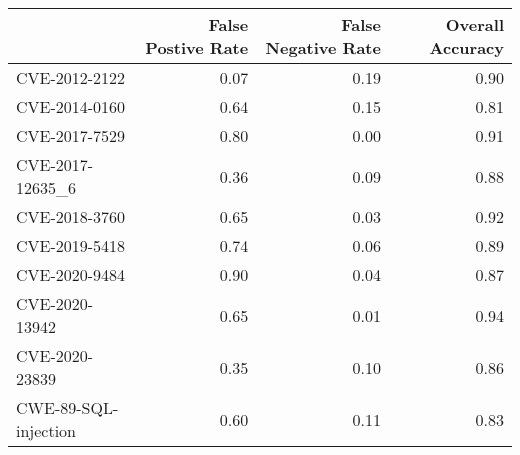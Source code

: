 \begin{tabular}{lrrr}
\toprule
{} &  False Postive Rate &  False Negative Rate &  Overall Accuracy \\
\midrule
CVE-2012-2122        &                0.07 &                 0.19 &              0.90 \\
CVE-2014-0160        &                0.64 &                 0.15 &              0.81 \\
CVE-2017-7529        &                0.80 &                 0.00 &              0.91 \\
CVE-2017-12635\_6     &                0.36 &                 0.09 &              0.88 \\
CVE-2018-3760        &                0.65 &                 0.03 &              0.92 \\
CVE-2019-5418        &                0.74 &                 0.06 &              0.89 \\
CVE-2020-9484        &                0.90 &                 0.04 &              0.87 \\
CVE-2020-13942       &                0.65 &                 0.01 &              0.94 \\
CVE-2020-23839       &                0.35 &                 0.10 &              0.86 \\
CWE-89-SQL-injection &                0.60 &                 0.11 &              0.83 \\
\bottomrule
\end{tabular}
